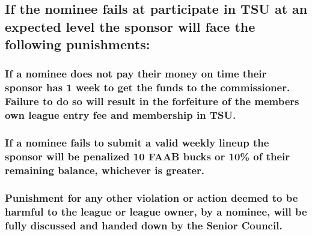 \documentclass[
]{book}
\begin{document}
\hypertarget{if-the-nominee-fails-at-participate-in-tsu-at-an-expected-level-the-sponsor-will-face-the-following-punishments}{%
\subsection{If the nominee fails at participate in TSU at an expected level the sponsor will face the following punishments:}\label{if-the-nominee-fails-at-participate-in-tsu-at-an-expected-level-the-sponsor-will-face-the-following-punishments}}

\hypertarget{if-a-nominee-does-not-pay-their-money-on-time-their-sponsor-has-1-week-to-get-the-funds-to-the-commissioner.-failure-to-do-so-will-result-in-the-forfeiture-of-the-members-own-league-entry-fee-and-membership-in-tsu.}{%
\subsubsection{If a nominee does not pay their money on time their sponsor has 1 week to get the funds to the commissioner. Failure to do so will result in the forfeiture of the members own league entry fee and membership in TSU.}\label{if-a-nominee-does-not-pay-their-money-on-time-their-sponsor-has-1-week-to-get-the-funds-to-the-commissioner.-failure-to-do-so-will-result-in-the-forfeiture-of-the-members-own-league-entry-fee-and-membership-in-tsu.}}

\hypertarget{if-a-nominee-fails-to-submit-a-valid-weekly-lineup-the-sponsor-will-be-penalized-10-faab-bucks-or-10-of-their-remaining-balance-whichever-is-greater.}{%
\subsubsection{If a nominee fails to submit a valid weekly lineup the sponsor will be penalized 10 FAAB bucks or 10\% of their remaining balance, whichever is greater.}\label{if-a-nominee-fails-to-submit-a-valid-weekly-lineup-the-sponsor-will-be-penalized-10-faab-bucks-or-10-of-their-remaining-balance-whichever-is-greater.}}

\hypertarget{punishment-for-any-other-violation-or-action-deemed-to-be-harmful-to-the-league-or-league-owner-by-a-nominee-will-be-fully-discussed-and-handed-down-by-the-senior-council.}{%
\subsubsection{Punishment for any other violation or action deemed to be harmful to the league or league owner, by a nominee, will be fully discussed and handed down by the Senior Council.}\label{punishment-for-any-other-violation-or-action-deemed-to-be-harmful-to-the-league-or-league-owner-by-a-nominee-will-be-fully-discussed-and-handed-down-by-the-senior-council.}}
\end{document}
